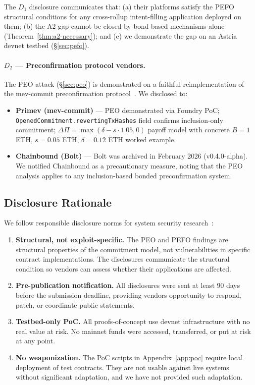 The $D_1$ disclosure communicates that: (a) their platforms satisfy the
PEFO structural conditions for any cross-rollup intent-filling application
deployed on them; (b) the A2 gap cannot be closed by bond-based mechanisms
alone (Theorem~\ref{thm:a2-necessary}); and (c) we demonstrate the gap
on an Astria devnet testbed (\S\ref{sec:pefo}).

\paragraph{$D_2$ --- Preconfirmation protocol vendors.}
The PEO attack (\S\ref{sec:peo}) is demonstrated on a faithful reimplementation
of the mev-commit preconfirmation protocol~\cite{MevCommit-Docs}. We disclosed to:

\begin{itemize}
  \item \textbf{Primev (mev-commit)} --- PEO demonstrated via Foundry PoC;
    \texttt{OpenedCommitment.revertingTxHashes} field confirms inclusion-only
    commitment; $\Delta\Pi = \max(\delta - s \cdot 1.05, 0)$ payoff model
    with concrete $B = 1$ ETH, $s = 0.05$ ETH, $\delta = 0.12$ ETH worked example.
  \item \textbf{Chainbound (Bolt)} --- Bolt was archived in February 2026
    (v0.4.0-alpha). We notified Chainbound as a precautionary measure,
    noting that the PEO analysis applies to any inclusion-based bonded
    preconfirmation system.
\end{itemize}

\subsection{Disclosure Rationale}
\label{sec:disclosure-rationale}

We follow responsible disclosure norms for system security
research~\cite{iso29147}:

\begin{enumerate}
  \item \textbf{Structural, not exploit-specific.} The PEO and PEFO
    findings are structural properties of the commitment model, not
    vulnerabilities in specific contract implementations. The disclosures
    communicate the structural condition so vendors can assess whether
    their applications are affected.
  \item \textbf{Pre-publication notification.} All disclosures were sent
    at least 90 days before the submission deadline, providing vendors
    opportunity to respond, patch, or coordinate public statements.
  \item \textbf{Testbed-only PoC.} All proofs-of-concept use devnet
    infrastructure with no real value at risk. No mainnet funds were accessed,
    transferred, or put at risk at any point.
  \item \textbf{No weaponization.} The PoC scripts in Appendix~\ref{app:poc}
    require local deployment of test contracts. They are not usable against
    live systems without significant adaptation, and we have not provided
    such adaptation.
\end{enumerate}

